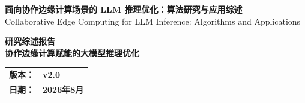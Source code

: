 \documentclass[13.5pt]{extarticle}
\begin{document}
\begin{titlepage}
    \centering
    \vspace*{2.5cm}

    {\Huge \textbf{面向协作边缘计算场景的 LLM 推理优化：算法研究与应用综述}} \\[1.2cm]
    {\Large Collaborative Edge Computing for LLM Inference: Algorithms and Applications} \\[3.2cm]

    \begin{center}
        {\fontsize{14}{0}\selectfont \textbf{研究综述报告}} \\[0.5cm]
        {\fontsize{12}{0}\selectfont \textbf{协作边缘计算赋能的大模型推理优化}}
    \end{center}

    \vfill

    \begin{center}
        \begin{tabular}{ll}
            \textbf{版本：} & \textbf{v2.0} \\
            \textbf{日期：} & \textbf{2026年8月} \\
        \end{tabular}
    \end{center}

    \vspace{1.5cm}
\end{titlepage}

\clearpage
{}

\begin{abstract}
大语言模型（LLM）推理正从云端集中式服务逐步向网络边缘迁移，以满足低时延、高带宽效率及数据隐私等需求。然而，单个边缘节点（如基站、边缘服务器、边缘网关）受限于计算、存储和通信资源，难以独立承载完整的大模型部署。协作边缘计算（CEC）通过将地理分布、能力异构的终端设备、边缘服务器及 AI 加速板卡整合为统一的协作资源池，为突破这一瓶颈提供了可行路径。在 CEC 框架下，模型切分、请求调度、键值（KV）缓存与上下文管理、服务路径选择等关键环节均可跨节点联合优化。然而，边缘场景下算力异构，资源受限，动态网络条件和请求，以及用户移动性等特性给LLM推理系统带来了新的研究挑战。

\par 本文围绕 CEC 场景下的大语言模型推理优化展开综述。首先，本文梳理 LLM inference 的基本执行机制、问题空间和“优化对象--执行范围”分类框架，并分析 CEC 相较云侧集中式 serving 新增的资源、网络、状态和移动性约束。在此基础上，本文重点讨论三类算法问题：\textbf{资源自适应模型切分部署、业务感知 batching，以及用户移动场景下的请求卸载与状态管理}。相关工作部分覆盖 layer、tensor、expert、prefill阶段和decoer阶段分离等切分方式；动态组批与 chunked prefill 等 batching  调度机制; 以及 request/session routing、context/KV/runtime state migration 和 multi-agent workflow orchestration 等请求调度方法。面向验证环境，报告进一步给出三项具体方案：以统一代价模型比较 TP、PP 和 PP+TP，并采用动态规划求解非均匀 PP 分割；以 CMDP 建模并采用带长期风险约束和安全投影的 Safe-RL 调节 batching策略，以确保不违反 SLO 约束；联合选择请求执行节点和 KV 获取方式，优化移动会话的长期服务成本。最后，本文讨论三类算法的协同关系及其在 Ascend 和 vLLM-Ascend 基础设施上的实现与评估方法。
\end{abstract}
\end{document}

